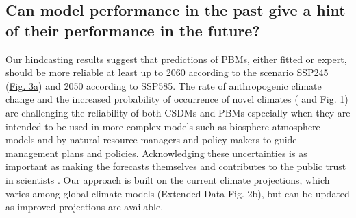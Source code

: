 \documentclass[pdflatex, sn-nature]{sn-jnl}%
\begin{document}
\subsection{Can model performance in the past give a hint of their performance in the future?}
Our hindcasting results suggest that predictions of PBMs, either fitted or expert, should be more reliable at least up to 2060 according to the scenario SSP245 (\hyperref[past_performance]{Fig. 3a}) and 2050 according to SSP585. The rate of anthropogenic climate change and the increased probability of occurrence of novel climates (\cite{Williams2007} and \hyperref[climatic_dissimilarity]{Fig. 1}) are challenging the reliability of both CSDMs and PBMs especially when they are intended to be used in more complex models such as biosphere-atmosphere models and by natural resource managers and policy makers to guide management plans and policies. Acknowledging these uncertainties is as important as making the forecasts themselves \cite{Beale2012} and contributes to the public trust in scientists \cite{Berkhout2010}. Our approach is built on the current climate projections, which varies among global climate models (Extended Data Fig. 2b), but can be updated as improved projections are available. 
\end{document}
